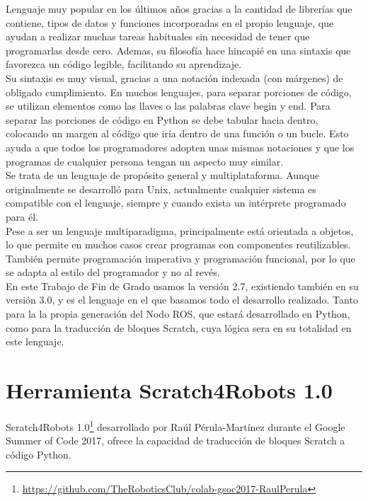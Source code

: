 Lenguaje muy popular en los últimos años gracias a la cantidad de librerías que contiene, tipos de datos y funciones incorporadas en el propio lenguaje, que ayudan a realizar muchas tareas habituales sin necesidad de tener que programarlas desde cero. Ademas, su filosofía hace hincapié en una sintaxis que favorezca un código legible, facilitando su aprendizaje.\\

Su sintaxis es muy visual, gracias a una notación indexada (con márgenes) de obligado cumplimiento. En muchos lenguajes, para separar porciones de código, se utilizan elementos como las llaves o las palabras clave begin y end. Para separar las porciones de código en Python se debe tabular hacia dentro, colocando un margen al código que iría dentro de una función o un bucle. Esto ayuda a que todos los programadores adopten unas mismas notaciones y que los programas de cualquier persona tengan un aspecto muy similar.\\

Se trata de un lenguaje de propósito general y multiplataforma. Aunque originalmente se desarrolló para Unix, actualmente cualquier sistema es compatible con el lenguaje, siempre y cuando exista un intérprete programado para él.\\

Pese a ser un lenguaje multiparadigma, principalmente está orientada a objetos, lo que permite en muchos casos crear programas con componentes reutilizables. También permite programación imperativa y programación funcional, por lo que se adapta al estilo del programador y no al revés.\\

En este Trabajo de Fin de Grado usamos la versión 2.7, existiendo también en su versión 3.0, y es el lenguaje en el que basamos todo el desarrollo realizado. Tanto para la  la propia generación del Nodo ROS, que estará desarrollado en Python, como para la traducción de bloques Scratch, cuya lógica sera en su totalidad en este lenguaje.\\

\section{Herramienta Scratch4Robots 1.0}
Scratch4Robots 1.0\footnote{\url{https://github.com/TheRoboticsClub/colab-gsoc2017-RaulPerula}} desarrollado por Raúl Pérula-Martínez durante el Google Summer of Code 2017, ofrece la capacidad de traducción de bloques Scratch a código Python.\\

